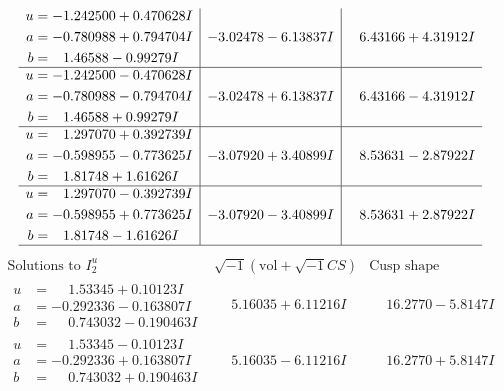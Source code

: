 \documentclass[1p]{elsarticle_modified}
\theoremstyle{definition}
\newcommand{\I}{\sqrt{-1}}
\begin{document}
$$\begin{array}{c|c|c}
\begin{aligned}
u &= -1.242500 + 0.470628 I \\
a &= -0.780988 + 0.794704 I \\
b &= \phantom{-}1.46588 - 0.99279 I\end{aligned}
 & -3.02478 - 6.13837 I & \phantom{-}6.43166 + 4.31912 I \\ \hline\begin{aligned}
u &= -1.242500 - 0.470628 I \\
a &= -0.780988 - 0.794704 I \\
b &= \phantom{-}1.46588 + 0.99279 I\end{aligned}
 & -3.02478 + 6.13837 I & \phantom{-}6.43166 - 4.31912 I \\ \hline\begin{aligned}
u &= \phantom{-}1.297070 + 0.392739 I \\
a &= -0.598955 - 0.773625 I \\
b &= \phantom{-}1.81748 + 1.61626 I\end{aligned}
 & -3.07920 + 3.40899 I & \phantom{-}8.53631 - 2.87922 I \\ \hline\begin{aligned}
u &= \phantom{-}1.297070 - 0.392739 I \\
a &= -0.598955 + 0.773625 I \\
b &= \phantom{-}1.81748 - 1.61626 I\end{aligned}
 & -3.07920 - 3.40899 I & \phantom{-}8.53631 + 2.87922 I\\
 \hline 
 \end{array}$$\newpage$$\begin{array}{c|c|c}  
\text{Solutions to }I^u_{2}& \I (\text{vol} + \sqrt{-1}CS) & \text{Cusp shape}\\
 \hline 
\begin{aligned}
u &= \phantom{-}1.53345 + 0.10123 I \\
a &= -0.292336 - 0.163807 I \\
b &= \phantom{-}0.743032 - 0.190463 I\end{aligned}
 & \phantom{-}5.16035 + 6.11216 I & \phantom{-}16.2770 - 5.8147 I \\ \hline\begin{aligned}
u &= \phantom{-}1.53345 - 0.10123 I \\
a &= -0.292336 + 0.163807 I \\
b &= \phantom{-}0.743032 + 0.190463 I\end{aligned}
 & \phantom{-}5.16035 - 6.11216 I & \phantom{-}16.2770 + 5.8147 I \\ \hline\begin{aligned}

\end{aligned}
\end{array}$$
\end{document}
